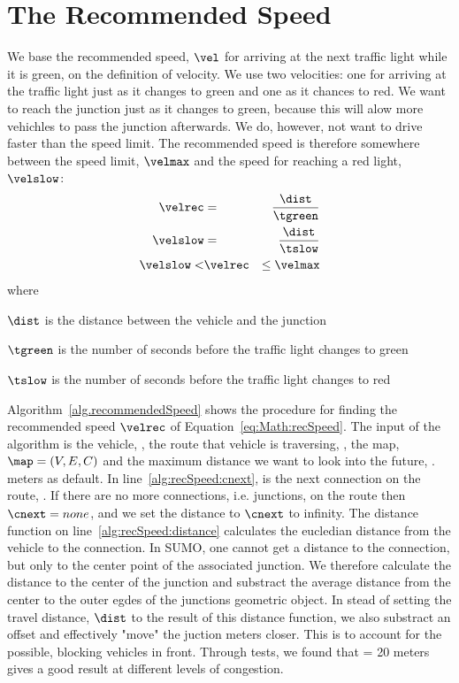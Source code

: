 \section{The Recommended Speed}\label{sec:Math}

We base the recommended speed, $\vel$ for arriving at the next traffic light while it is green, on the definition of velocity.
We use two velocities: one for arriving at the traffic light just as it changes to green and one as it chances to red.
We want to reach the junction just as it changes to green, because this will alow more vehichles to pass the junction afterwards.
We do, however, not want to drive faster than the speed limit.
The recommended speed is therefore somewhere between the speed limit, $\velmax$ and the speed for reaching a red light, $\velslow$:
\begin{eqnarray}
\velrec &=& \frac{\dist}{\tgreen}\label{eq:Math:h}\\
\velslow &=& \frac{\dist}{\tslow}\nonumber\\
\velslow < &\velrec& \leq \velmax\label{eq:Math:recSpeed}
\end{eqnarray}
where
\vspace{-5mm}
\begin{itemize*}
\item $\dist$ is the distance between the vehicle and the junction
\item $\tgreen$ is the number of seconds before the traffic light changes to green
\item $\tslow$ is the number of seconds before the traffic light changes to red
\end{itemize*}

Algorithm~\ref{alg.recommendedSpeed} shows the procedure for finding the recommended speed $\velrec$ of Equation~\ref{eq:Math:recSpeed}.
The input of the algorithm is the vehicle, \veh, the route that vehicle is traversing, \route, the map, $\map = (V, E, C)$ and the maximum distance we want to look into the future, \distmax. 
 meters as default. %
In line~\ref{alg:recSpeed:cnext}, \cnext is the next connection on the route, \route. 
If there are no more connections, i.e. junctions, on the route then $\cnext=none$, and we set the distance to $\cnext$ to infinity.
The distance function on line~\ref{alg:recSpeed:distance} calculates the eucledian distance from the vehicle to the connection.
In SUMO, one cannot get a distance to the connection, but only to the center point of the associated junction.
We therefore calculate the distance to the center of the junction and substract the average distance from the center to the outer egdes of the junctions geometric object. 
In stead of setting the travel distance, $\dist$ to the result of this distance function, we also substract an offset and effectively "move" the juction \distOffset meters closer.
This is to account for the possible, blocking vehicles in front. 
Through tests, we found that \distOffset = 20 meters gives a good result at different levels of congestion.

